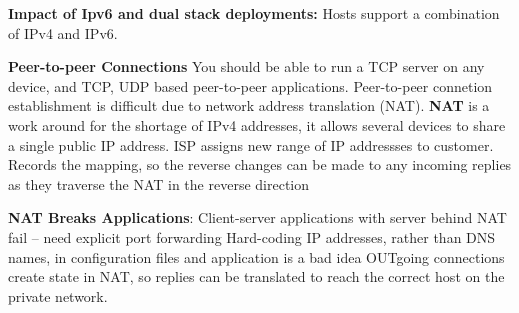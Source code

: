 \documentclass{article}
\begin{document}
\noindent \textbf{Impact of Ipv6 and dual stack deployments:}
Hosts support a combination of IPv4 and IPv6.

\noindent \textbf{Peer-to-peer Connections}
You should be able to run a TCP server on any device, and TCP, UDP based peer-to-peer applications.
Peer-to-peer connetion establishment is difficult due to network address translation (NAT).
\noindent \textbf{NAT} is a work around for the shortage of IPv4 addresses, it allows several devices to share a single public IP address.
ISP assigns new range of IP addressses to customer.
Records the mapping, so the reverse changes can be made to any incoming replies as they traverse the NAT in the reverse direction

\noindent \textbf{NAT Breaks Applications}:
Client-server applications with server behind NAT fail – need explicit port forwarding
Hard-coding IP addresses, rather than DNS names, in configuration files and application is a bad idea
OUTgoing connections create state in NAT, so replies can be translated to reach the correct host on the private network.
\end{document}
